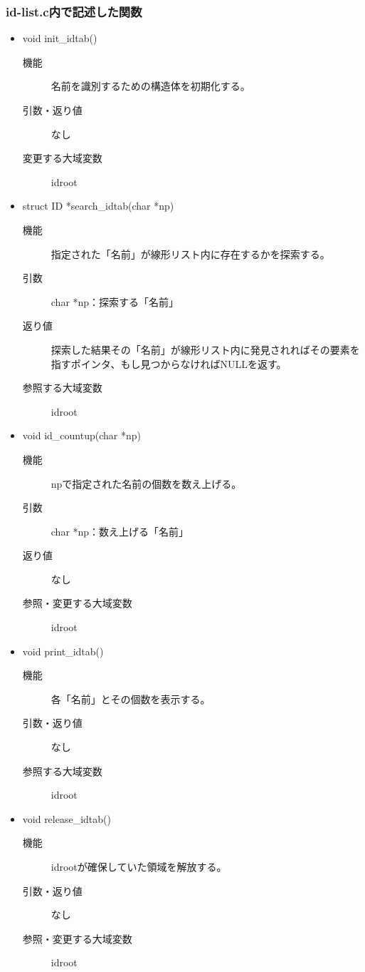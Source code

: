 \documentclass{jarticle}
\begin{document}
\subsubsection{id-list.c内で記述した関数}
\begin{itemize}
  \item void init\_idtab()
  \begin{description}
\item[機能]名前を識別するための構造体を初期化する。
\item[引数・返り値]なし
\item[変更する大域変数]idroot
\end{description}
\item struct ID *search\_idtab(char *np)
\begin{description}
\item[機能]指定された「名前」が線形リスト内に存在するかを探索する。
\item[引数]char *np：探索する「名前」
\item[返り値]探索した結果その「名前」が線形リスト内に発見されればその要素を指すポインタ、もし見つからなければNULLを返す。
\item[参照する大域変数]idroot
\end{description}
\item void id\_countup(char *np)
\begin{description}
\item[機能]npで指定された名前の個数を数え上げる。
\item[引数]char *np：数え上げる「名前」
\item[返り値]なし
\item[参照・変更する大域変数]idroot
\end{description}
\item void print\_idtab()
\begin{description}
\item[機能]各「名前」とその個数を表示する。
\item[引数・返り値]なし
\item[参照する大域変数]idroot
\end{description}
\item void release\_idtab()
\begin{description}
\item[機能]idrootが確保していた領域を解放する。
\item[引数・返り値]なし
\item[参照・変更する大域変数]idroot
\end{description}
\end{itemize}
\end{document}
